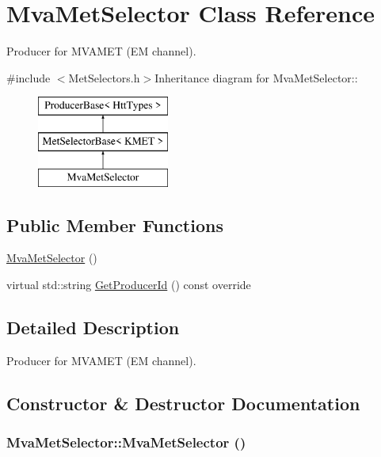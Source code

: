 \hypertarget{classMvaMetSelector}{
\section{MvaMetSelector Class Reference}
\label{classMvaMetSelector}
}


Producer for MVAMET (EM channel).  


{\ttfamily \#include $<$MetSelectors.h$>$}Inheritance diagram for MvaMetSelector::\begin{figure}[H]
\begin{center}
\leavevmode
\includegraphics[height=3cm]{classMvaMetSelector}
\end{center}
\end{figure}
\subsection*{Public Member Functions}
\begin{DoxyCompactItemize}
\item 
\hyperlink{classMvaMetSelector_a041bf6d3a24c92e3ee432337d563c8be}{MvaMetSelector} ()
\item 
virtual std::string \hyperlink{classMvaMetSelector_aa8e88529d9b7d537c6bd69c588e449f4}{GetProducerId} () const override
\end{DoxyCompactItemize}


\subsection{Detailed Description}
Producer for MVAMET (EM channel). 

\subsection{Constructor \& Destructor Documentation}
\hypertarget{classMvaMetSelector_a041bf6d3a24c92e3ee432337d563c8be}{
\subsubsection[{MvaMetSelector}]{\setlength{\rightskip}{0pt plus 5cm}MvaMetSelector::MvaMetSelector ()}}
\label{classMvaMetSelector_a041bf6d3a24c92e3ee432337d563c8be}


